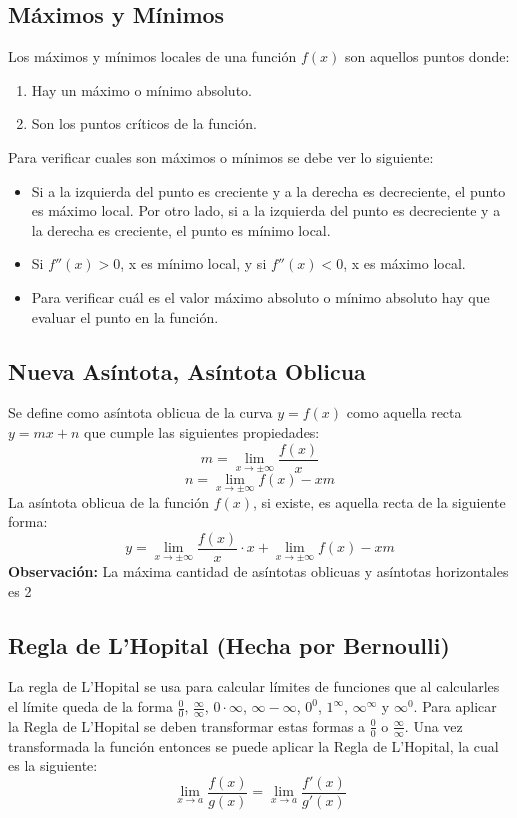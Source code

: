 \subsection*{Máximos y Mínimos}
Los máximos y mínimos locales de una función $f(x)$ son aquellos puntos donde:
\begin{enumerate}
	\item Hay un máximo o mínimo absoluto.
	\item Son los puntos críticos de la función.
\end{enumerate}

Para verificar cuales son máximos o mínimos se debe ver lo siguiente:
\begin{itemize}
	\item Si a la izquierda del punto es creciente y a la derecha es decreciente, el punto es máximo local. Por otro lado, si a la izquierda del punto es decreciente y a la derecha es creciente, el punto es mínimo local.
	\item Si $f''(x)>0$, x es mínimo local, y si $f''(x)<0$, x es máximo local.
	\item Para verificar cuál es el valor máximo absoluto o mínimo absoluto hay que evaluar el punto en la función.
\end{itemize}
%
\subsection*{Nueva Asíntota, Asíntota Oblicua}
%
Se define como asíntota oblicua de la curva $y=f(x)$ como aquella recta $y=mx+n$ que cumple las siguientes propiedades:\\
$$ m = \lim_{x \to \pm\infty}\frac{f(x)}{x}$$
$$ n = \lim_{x \to \pm\infty} f(x)-xm$$
La asíntota oblicua de la función $f(x)$, si existe, es aquella recta de la siguiente forma:
\[y=\lim_{x \to \pm\infty}\frac{f(x)}{x}\cdot x + \lim_{x \to \pm\infty} f(x)-xm\]
\textbf{Observación:} La máxima cantidad de asíntotas oblicuas y asíntotas horizontales es 2
%
\subsection*{Regla de L'Hopital (Hecha por Bernoulli)}

La regla de L'Hopital se usa para calcular límites de funciones que al calcularles el límite queda de la forma $\frac{0}{0}$, $\frac{\infty}{\infty}$, $0 \cdot \infty$, $\infty-\infty$, $0^{0}$, $1^{\infty}$, $\infty^{\infty}$ y $\infty^{0}$. Para aplicar la Regla de L'Hopital se deben transformar estas formas a $\frac{0}{0}$ o $\frac{\infty}{\infty}$. Una vez transformada la  función entonces se puede aplicar la Regla de L'Hopital, la cual es la siguiente:
\[\lim_{x\to a} \frac{f(x)}{g(x)}=\lim_{x\to a} \frac{f'(x)}{g'(x)}\]